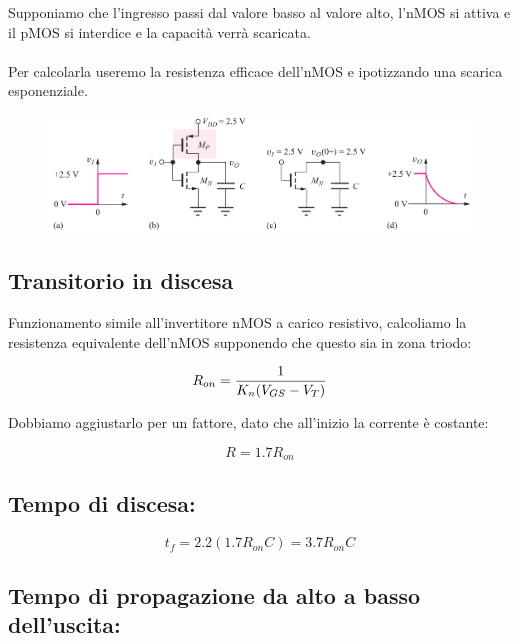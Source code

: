 Supponiamo che l'ingresso passi dal valore basso al valore alto, l'nMOS si attiva e il pMOS si interdice e la capacità verrà scaricata.
\paragraph{}
Per calcolarla useremo la resistenza efficace dell'nMOS e  ipotizzando una scarica esponenziale.


\begin{figure}[htbp]
    \centering
    \includegraphics[width=0.95\linewidth]{img/dinamico.png}
    
    
\end{figure}


\subsection{Transitorio in discesa}

Funzionamento simile all'invertitore nMOS a carico resistivo, calcoliamo la resistenza equivalente dell'nMOS supponendo che questo sia in zona triodo:

\begin{equation*}
    R_{on} =\frac{1}{K_n(V_{GS} - V_{T})}
\end{equation*}

Dobbiamo aggiustarlo per un fattore, dato che all'inizio la corrente è costante:

\begin{equation*}
    R = 1.7R_{on}
\end{equation*}

\subsection{Tempo di discesa:}

\begin{equation*}
    t_f = 2.2(1.7R_{on}C) = 3.7R_{on}C
\end{equation*}

\subsection{Tempo di propagazione da alto a basso dell'uscita:}

